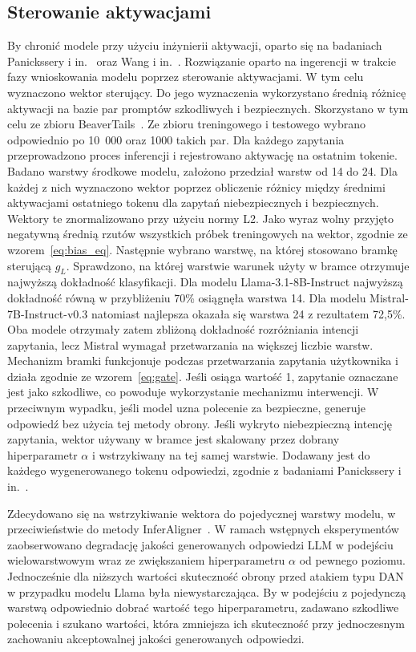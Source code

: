 \subsection{Sterowanie aktywacjami}
By chronić modele przy użyciu inżynierii aktywacji, oparto się na badaniach Panickssery i in.~\cite{panickssery2024steeringllama2contrastive} oraz Wang i in.~\cite{wang2024inferalignerinferencetimealignmentharmlessness}. Rozwiązanie oparto na ingerencji w trakcie fazy wnioskowania modelu poprzez sterowanie aktywacjami. W tym celu wyznaczono wektor sterujący. Do jego wyznaczenia wykorzystano średnią różnicę aktywacji na bazie par promptów szkodliwych i bezpiecznych. Skorzystano w tym celu ze zbioru BeaverTails~\cite{ji2023beavertailsimprovedsafetyalignment}. Ze zbioru treningowego i testowego wybrano odpowiednio po 10~000 oraz 1000 takich par. Dla każdego zapytania przeprowadzono proces inferencji i rejestrowano aktywację na ostatnim tokenie. Badano warstwy środkowe modelu, założono przedział warstw od 14 do 24. Dla każdej z nich wyznaczono wektor poprzez obliczenie różnicy między średnimi aktywacjami ostatniego tokenu dla zapytań niebezpiecznych i bezpiecznych. Wektory te znormalizowano przy użyciu normy L2.
Jako wyraz wolny przyjęto negatywną średnią rzutów wszystkich próbek treningowych na wektor, zgodnie ze wzorem~\ref{eq:bias_eq}. Następnie wybrano warstwę, na której stosowano bramkę sterującą $g_L$. Sprawdzono, na której warstwie warunek użyty w bramce otrzymuje najwyższą dokładność klasyfikacji. Dla modelu Llama-3.1-8B-Instruct najwyższą dokładność równą w przybliżeniu 70\% osiągnęła warstwa 14. Dla modelu Mistral-7B-Instruct-v0.3 natomiast najlepsza okazała się warstwa 24 z rezultatem 72,5\%. Oba modele otrzymały zatem zbliżoną dokładność rozróżniania intencji zapytania, lecz Mistral wymagał przetwarzania na większej liczbie warstw. Mechanizm bramki funkcjonuje podczas przetwarzania zapytania użytkownika i działa zgodnie ze wzorem~\ref{eq:gate}. Jeśli osiąga wartość 1, zapytanie oznaczane jest jako szkodliwe, co powoduje wykorzystanie mechanizmu interwencji. W przeciwnym wypadku, jeśli model uzna polecenie za bezpieczne, generuje odpowiedź bez użycia tej metody obrony. Jeśli wykryto niebezpieczną intencję zapytania, wektor używany w bramce jest skalowany przez dobrany hiperparametr $\alpha$ i wstrzykiwany na tej samej warstwie. Dodawany jest do każdego wygenerowanego tokenu odpowiedzi, zgodnie z badaniami Panickssery i in.~\cite{panickssery2024steeringllama2contrastive}.

Zdecydowano się na wstrzykiwanie wektora do pojedycznej warstwy modelu, w przeciwieństwie do metody InferAligner~\cite{wang2024inferalignerinferencetimealignmentharmlessness}. W ramach wstępnych eksperymentów zaobserwowano degradację jakości generowanych odpowiedzi \gls{LLM} w podejściu wielowarstwowym wraz ze zwiększaniem hiperparametru $\alpha$ od pewnego poziomu. Jednocześnie dla niższych wartości skuteczność obrony przed atakiem typu \gls{DAN} w przypadku modelu Llama była niewystarczająca. By w podejściu z pojedynczą warstwą odpowiednio dobrać wartość tego hiperparametru, zadawano szkodliwe polecenia i szukano wartości, która zmniejsza ich skuteczność przy jednoczesnym zachowaniu akceptowalnej jakości generowanych odpowiedzi.

